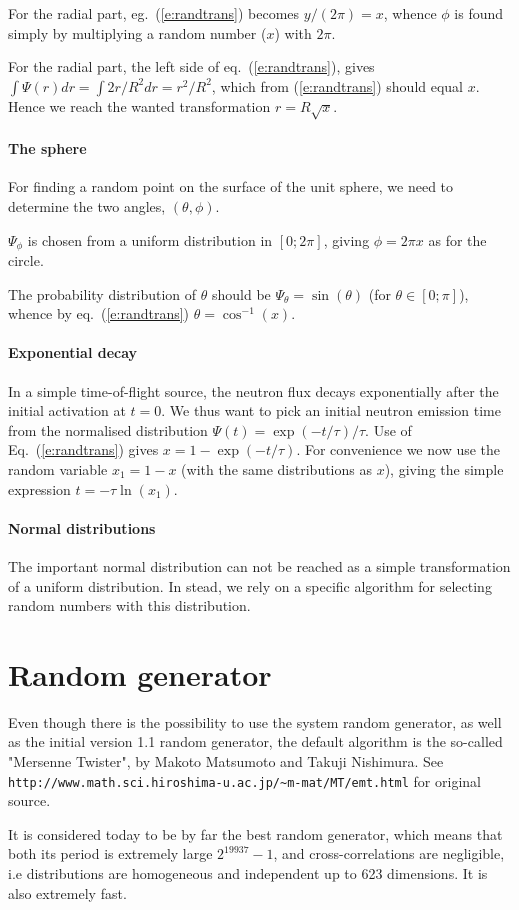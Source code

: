 For the radial part,
eg.~(\ref{e:randtrans}) becomes $y/(2 \pi) = x$, whence
$\phi$ is found simply by multiplying a random number ($x$)
with $2\pi$.

For the radial part, the left side of eq.~(\ref{e:randtrans}), gives
$\int \Psi(r) dr = \int 2 r/R^2 dr = r^2/R^2$,
which from (\ref{e:randtrans}) should equal $x$.
Hence we reach the wanted transformation $r = R\sqrt{x}$.

\paragraph{The sphere}
For finding a random point on the surface of the unit sphere,
we need to determine the two angles, $(\theta, \phi)$.

$\Psi_\phi$ is chosen from a uniform distribution
in $[0; 2\pi]$, giving $\phi = 2\pi x$ as for the circle.

The probability distribution of $\theta$ should be
$\Psi_\theta=\sin(\theta)$ (for $\theta \in [0; \pi ]$),
whence by eq.~(\ref{e:randtrans}) $\theta=\cos^{-1}(x)$.

\paragraph{Exponential decay}
In a simple time-of-flight source, the neutron flux decays exponentially
after the initial activation at $t=0$. We thus want to pick an initial
neutron emission time from the normalised distribution
$\Psi(t) = \exp(-t/\tau) / \tau$.
Use of Eq.~(\ref{e:randtrans}) gives
$x = 1 - \exp(-t/\tau)$. For convenience we now use the random variable
$x_1 = 1-x$ (with the same distributions as $x$),
giving the simple expression $t = - \tau \ln (x_1)$.

\paragraph{Normal distributions}
The important normal distribution can not be reached as a simple
transformation of a uniform distribution.
In stead, we rely on a specific algorithm for selecting random
numbers with this distribution.

\section{Random generator}

Even though there is
the possibility to use the system random generator, as well as the initial \MCS
version 1.1 random generator, the default algorithm is the so-called "Mersenne
Twister", by Makoto Matsumoto and Takuji Nishimura. See \\
\verb+http://www.math.sci.hiroshima-u.ac.jp/~m-mat/MT/emt.html+ for original
source.

It is considered today to be by far the best random generator, which means that
both its period is extremely large $2^{19937}-1$, and cross-correlations are
negligible, i.e distributions are homogeneous and independent up to 623
dimensions. It is also extremely fast.
